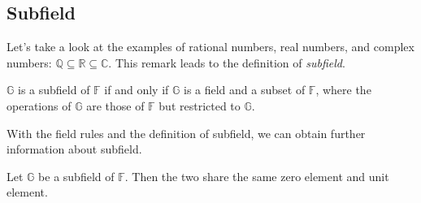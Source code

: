 \subsection{Subfield}

Let's take a look at the examples of rational numbers, real numbers, and complex numbers: $\mathbb{Q}\subseteq\mathbb{R}\subseteq\mathbb{C}$. This remark leads to the definition of \textit{subfield}.

\begin{definition}[Subfield]
    $\mathbb{G}$ is a subfield of $\mathbb{F}$ if and only if $\mathbb{G}$ is a field and a subset of $\mathbb{F}$, where the operations of $\mathbb{G}$ are those of $\mathbb{F}$ but restricted to $\mathbb{G}$.
\end{definition}

With the field rules and the definition of subfield, we can obtain further information about subfield.

\begin{theorem}
    Let $\mathbb{G}$ be a subfield of $\mathbb{F}$. Then the two share the same zero element and unit element.
\end{theorem}

